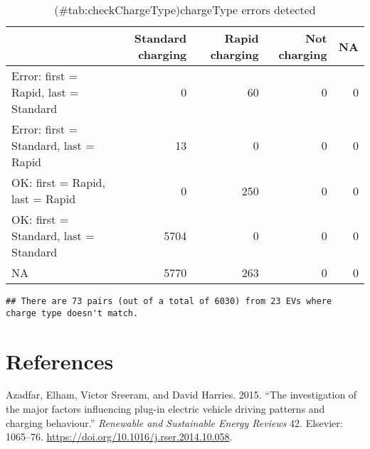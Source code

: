 \documentclass[]{article}
\newenvironment{Shaded}{\begin{snugshade}}{\end{snugshade}}
\newcommand{\DecValTok}[1]{\textcolor[rgb]{0.00,0.00,0.81}{#1}}
\newcommand{\KeywordTok}[1]{\textcolor[rgb]{0.13,0.29,0.53}{\textbf{#1}}}
\newcommand{\NormalTok}[1]{#1}
\newcommand{\OperatorTok}[1]{\textcolor[rgb]{0.81,0.36,0.00}{\textbf{#1}}}
\newcommand{\StringTok}[1]{\textcolor[rgb]{0.31,0.60,0.02}{#1}}
\begin{document}
\begin{table}[t]

\caption{(\#tab:checkChargeType)chargeType errors detected}
\centering
\begin{tabular}{l|r|r|r|r}
\hline
  & Standard charging & Rapid charging & Not charging & NA\\
\hline
Error: first = Rapid, last = Standard & 0 & 60 & 0 & 0\\
\hline
Error: first = Standard, last = Rapid & 13 & 0 & 0 & 0\\
\hline
OK: first = Rapid, last = Rapid & 0 & 250 & 0 & 0\\
\hline
OK: first = Standard, last = Standard & 5704 & 0 & 0 & 0\\
\hline
NA & 5770 & 263 & 0 & 0\\
\hline
\end{tabular}
\end{table}

\begin{Shaded}
\end{Shaded}

\begin{verbatim}
## There are 73 pairs (out of a total of 6030) from 23 EVs where charge type doesn't match.
\end{verbatim}

\hypertarget{references}{%
\section*{References}\label{references}}

\hypertarget{refs}{}
\leavevmode\hypertarget{ref-Azadfar2015}{}%
Azadfar, Elham, Victor Sreeram, and David Harries. 2015. ``The investigation of the major factors influencing plug-in electric vehicle driving patterns and charging behaviour.'' \emph{Renewable and Sustainable Energy Reviews} 42. Elsevier: 1065--76. \url{https://doi.org/10.1016/j.rser.2014.10.058}.
\end{document}
